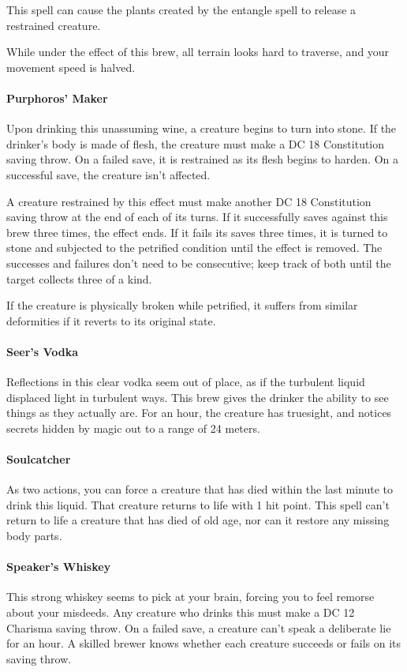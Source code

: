         This spell can cause the plants created by the entangle spell to release a restrained creature.

        While under the effect of this brew, all terrain looks hard to traverse, and your movement speed is halved.
    \paragraph{Purphoros' Maker} %
        Upon drinking this unassuming wine, a creature begins to turn into stone.
        If the drinker's body is made of flesh, the creature must make a DC 18 Constitution saving throw.
        On a failed save, it is restrained as its flesh begins to harden.
        On a successful save, the creature isn't affected.

        A creature restrained by this effect must make another DC 18 Constitution saving throw at the end of each of its turns.
        If it successfully saves against this brew three times, the effect ends.
        If it fails its saves three times, it is turned to stone and subjected to the petrified condition until the effect is removed.
        The successes and failures don't need to be consecutive; keep track of both until the target collects three of a kind.

        If the creature is physically broken while petrified, it suffers from similar deformities if it reverts to its original state.
    \paragraph{Seer's Vodka} %
        Reflections in this clear vodka seem out of place, as if the turbulent liquid displaced light in turbulent ways.
        This brew gives the drinker the ability to see things as they actually are.
        For an hour, the creature has truesight, and notices secrets hidden by magic out to a range of 24 meters.
    \paragraph{Soulcatcher} %
        As two actions, you can force a creature that has died within the last minute to drink this liquid.
        That creature returns to life with 1 hit point.
        This spell can't return to life a creature that has died of old age, nor can it restore any missing body parts.
    \paragraph{Speaker's Whiskey} %
        This strong whiskey seems to pick at your brain, forcing you to feel remorse about your misdeeds.
        Any creature who drinks this must make a DC 12 Charisma saving throw.
        On a failed save, a creature can't speak a deliberate lie for an hour.
        A skilled brewer knows whether each creature succeeds or fails on its saving throw.

